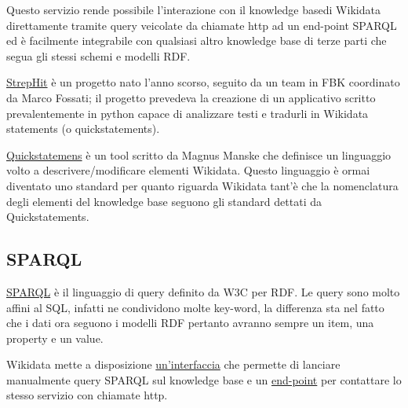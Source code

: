Questo servizio rende possibile l'interazione con 
il knowledge basedi Wikidata direttamente tramite query veicolate da chiamate http ad un end-point SPARQL ed è facilmente integrabile con qualsiasi altro knowledge base di terze parti che segua gli stessi schemi e modelli RDF.

\href{https://www.mediawiki.org/wiki/StrepHit}{StrepHit} è un progetto nato l'anno scorso, seguito da un team in FBK coordinato da Marco Fossati; il progetto prevedeva la creazione di un applicativo scritto prevalentemente 
in python capace di analizzare testi e tradurli in Wikidata statements (o quickstatements).  

\href{https://www.mediawiki.org/wiki/StrepHit}{Quickstatemens} è un tool scritto da Magnus Manske che definisce un linguaggio volto a descrivere/modificare elementi Wikidata. Questo linguaggio è ormai diventato uno standard 
per quanto riguarda Wikidata tant'è che la nomenclatura degli elementi del knowledge base seguono gli standard dettati da Quickstatements.

\subsection{SPARQL}
\href{https://www.w3.org/TR/sparql11-query/}{SPARQL} è il linguaggio di query definito da W3C per RDF. Le query sono molto affini al SQL, infatti ne condividono molte key-word, la differenza sta nel fatto che i dati ora 
seguono i modelli RDF pertanto avranno sempre un item, una property e un value.

Wikidata mette a disposizione \href{https://query.wikidata.org/}{un'interfaccia} che permette di lanciare manualmente query SPARQL sul knowledge base
e un \href{https://query.wikidata.org/bigdata/namespace/wdq/sparql?query={SPARQL}}{end-point} per contattare lo stesso servizio con chiamate http. 
